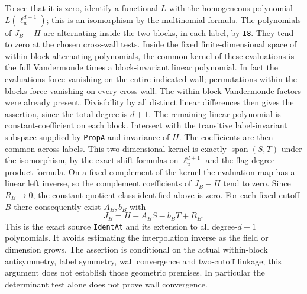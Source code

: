 To see that it is zero, identify a functional \(L\) with the
homogeneous polynomial \(L(\ell_u^{d+1})\); this is an isomorphism
by the multinomial formula. The polynomials of \(J_B-H\)
are alternating inside the two blocks, in each label, by
\texttt{I8}. They tend to zero at the chosen cross-wall tests.
Inside the fixed finite-dimensional space of within-block
alternating polynomials, the common kernel of these evaluations
is the full Vandermonde times a block-invariant linear polynomial.
In fact the evaluations force vanishing on the entire indicated
wall; permutations within the blocks force vanishing on every
cross wall. The within-block Vandermonde factors were already
present. Divisibility by all distinct linear differences then
gives the assertion, since the total degree is \(d+1\).
The remaining linear polynomial is constant-coefficient on
each block. Intersect with the transitive label-invariant
subspace supplied by \texttt{PropA} and invariance of \(H\).
The coefficients are then common across labels.
This two-dimensional kernel is exactly \(\operatorname{span}(S,T)\)
under the isomorphism, by the exact shift formulas on
\(\ell_u^{d+1}\) and the flag degree product formula.
On a fixed complement of the kernel the evaluation map has
a linear left inverse, so the complement coefficients of
\(J_B-H\) tend to zero. Since \(R_B\to0\), the constant quotient
class identified above is zero. For each fixed cutoff \(B\)
there consequently exist \(A_B,b_B\) with
\[
 J_B=H-A_B S-b_B T+R_B .
\]
This is the exact source \texttt{IdentAt} and its extension
to all degree-\(d+1\) polynomials. It avoids estimating the
interpolation inverse as the field or dimension grows.
The assertion is conditional on the actual within-block
antisymmetry, label symmetry, wall convergence and two-cutoff
linkage; this argument does not establish those geometric
premises. In particular the determinant test alone does not
prove wall convergence.

